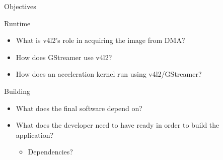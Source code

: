 \documentclass[allowframebreaks]{beamer}
\begin{document}
\begin{frame}[label={sec:org444c1eb}]{Objectives}
\begin{block}{Runtime}
\begin{itemize}
\item What is v4l2's role in acquiring the image from DMA?
\item How does GStreamer use v4l2?
\item How does an acceleration kernel run using v4l2/GStreamer?
\end{itemize}
\end{block}
\begin{block}{Building}
\begin{itemize}
\item What does the final software depend on?
\item What does the developer need to have ready in order to build the application?
\begin{itemize}
\item Dependencies?
\end{itemize}
\end{itemize}
\end{block}
\end{frame}
\end{document}
